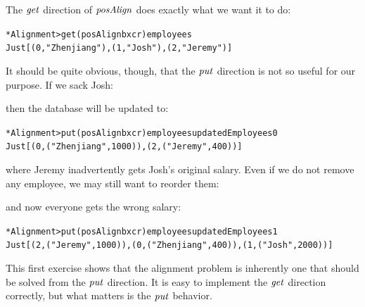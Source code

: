 The \ensuremath{\Varid{get}} direction of \ensuremath{\Varid{posAlign}} does exactly what we want it to do:
\begin{alltt}
*Alignment> get (posAlign bx cr) employees
Just [(0,"Zhenjiang"),(1,"Josh"),(2,"Jeremy")]
\end{alltt}
It should be quite obvious, though, that the \ensuremath{\Varid{put}} direction is not so useful for our purpose.
If we sack Josh:
\resethooks
then the database will be updated to:
\begin{alltt}
*Alignment> put (posAlign bx cr) employees updatedEmployees0
Just [(0,("Zhenjiang",1000)),(2,("Jeremy",400))]
\end{alltt}
where Jeremy inadvertently gets Josh's original salary.
Even if we do not remove any employee, we may still want to reorder them:
\resethooks
and now everyone gets the wrong salary:
\begin{alltt}
*Alignment> put (posAlign bx cr) employees updatedEmployees1
Just [(2,("Jeremy",1000)),(0,("Zhenjiang",400)),(1,("Josh",2000))]
\end{alltt}
This first exercise shows that the alignment problem is inherently one that should be solved from the \ensuremath{\Varid{put}} direction.
It is easy to implement the \ensuremath{\Varid{get}} direction correctly, but what matters is the \ensuremath{\Varid{put}} behavior.

